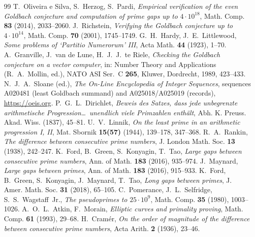 \documentclass[11pt]{article}
\theoremstyle{plain}
\theoremstyle{definition}
\theoremstyle{remark}
\begin{document}
\begin{thebibliography}{99}
 T.~Oliveira e Silva, S.~Herzog, S.~Pardi, \emph{Empirical
verification of the even Goldbach conjecture and computation of prime gaps up to
$4\cdot10^{18}$}, Math. Comp. \textbf{83} (2014), 2033--2060.
 J.~Richstein, \emph{Verifying the Goldbach conjecture up to
$4\cdot10^{14}$}, Math. Comp. \textbf{70} (2001), 1745--1749.
 G.~H.~Hardy, J.~E.~Littlewood, \emph{Some problems of `Partitio
Numerorum' III}, Acta Math. \textbf{44} (1923), 1--70.
 A.~Granville, J.~van de Lune, H.~J.~J.~te Riele, \emph{Checking
the Goldbach conjecture on a vector computer}, in: Number Theory and Applications
(R.~A.~Mollin, ed.), NATO ASI Ser.~C \textbf{265}, Kluwer, Dordrecht, 1989,
423--433.
 N.~J.~A.~Sloane (ed.), \emph{The On-Line Encyclopedia of Integer
Sequences}, sequences A020481 (least Goldbach summand) and A025018/A025019
(records), \url{https://oeis.org}.
 P.~G.~L.~Dirichlet, \emph{Beweis des Satzes, dass jede
unbegrenzte arithmetische Progression\dots\ unendlich viele Primzahlen
enth\"alt}, Abh. K. Preuss. Akad. Wiss. (1837), 45--81.
 U.~V.~Linnik, \emph{On the least prime in an arithmetic
progression I, II}, Mat. Sbornik \textbf{15(57)} (1944), 139--178, 347--368.
 R.~A.~Rankin, \emph{The difference between consecutive prime
numbers}, J. London Math. Soc. \textbf{13} (1938), 242--247.
 K.~Ford, B.~Green, S.~Konyagin, T.~Tao, \emph{Large gaps between
consecutive prime numbers}, Ann. of Math. \textbf{183} (2016), 935--974.
 J.~Maynard, \emph{Large gaps between primes}, Ann. of Math.
\textbf{183} (2016), 915--933.
 K.~Ford, B.~Green, S.~Konyagin, J.~Maynard, T.~Tao, \emph{Long
gaps between primes}, J. Amer. Math. Soc. \textbf{31} (2018), 65--105.
 C.~Pomerance, J.~L.~Selfridge, S.~S.~Wagstaff~Jr., \emph{The
pseudoprimes to $25\cdot10^9$}, Math. Comp. \textbf{35} (1980), 1003--1026.
 A.~O.~L.~Atkin, F.~Morain, \emph{Elliptic curves and
primality proving}, Math. Comp. \textbf{61} (1993), 29--68.
 H.~Cram\'er, \emph{On the order of magnitude of the difference
between consecutive prime numbers}, Acta Arith. \textbf{2} (1936), 23--46.
\end{thebibliography}

\appendix
\end{document}
